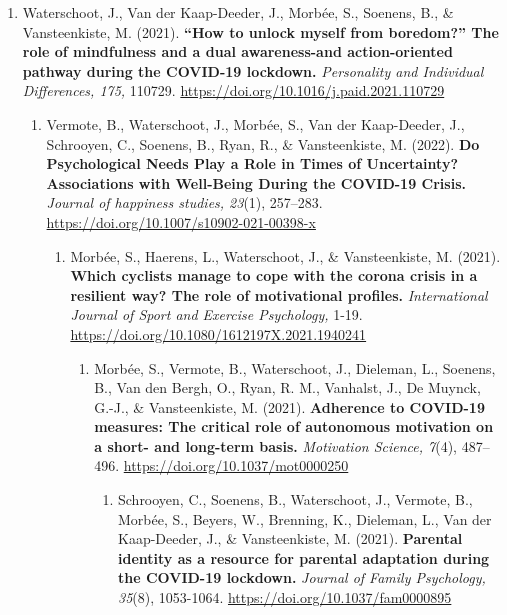 \documentclass[
  twocolumn]{article}
\providecommand{\tightlist}{%
  \setlength{\itemsep}{0pt}\setlength{\parskip}{0pt}}
\begin{document}
\begin{enumerate}
\def\labelenumi{\arabic{enumi}.}
\setcounter{enumi}{8}
\tightlist
\item
  Waterschoot, J., Van der Kaap-Deeder, J., Morbée, S., Soenens, B., \&
  Vansteenkiste, M. (2021). \textbf{``How to unlock myself from
  boredom?'' The role of mindfulness and a dual awareness-and
  action-oriented pathway during the COVID-19 lockdown.}
  \emph{Personality and Individual Differences, 175,} 110729.
  \url{https://doi.org/10.1016/j.paid.2021.110729}

  \begin{enumerate}
  \def\labelenumii{\arabic{enumii}.}
  \setcounter{enumii}{7}
  \tightlist
  \item
    Vermote, B., Waterschoot, J., Morbée, S., Van der Kaap-Deeder, J.,
    Schrooyen, C., Soenens, B., Ryan, R., \& Vansteenkiste, M. (2022).
    \textbf{Do Psychological Needs Play a Role in Times of Uncertainty?
    Associations with Well-Being During the COVID-19 Crisis.}
    \emph{Journal of happiness studies, 23}(1), 257--283.
    \url{https://doi.org/10.1007/s10902-021-00398-x}

    \begin{enumerate}
    \def\labelenumiii{\arabic{enumiii}.}
    \setcounter{enumiii}{6}
    \tightlist
    \item
      Morbée, S., Haerens, L., Waterschoot, J., \& Vansteenkiste, M.
      (2021). \textbf{Which cyclists manage to cope with the corona
      crisis in a resilient way? The role of motivational profiles.}
      \emph{International Journal of Sport and Exercise Psychology,}
      1-19. \url{https://doi.org/10.1080/1612197X.2021.1940241}

      \begin{enumerate}
      \def\labelenumiv{\arabic{enumiv}.}
      \setcounter{enumiv}{5}
      \tightlist
      \item
        Morbée, S., Vermote, B., Waterschoot, J., Dieleman, L., Soenens,
        B., Van den Bergh, O., Ryan, R. M., Vanhalst, J., De Muynck,
        G.-J., \& Vansteenkiste, M. (2021). \textbf{Adherence to
        COVID-19 measures: The critical role of autonomous motivation on
        a short- and long-term basis.} \emph{Motivation Science, 7}(4),
        487--496. \url{https://doi.org/10.1037/mot0000250}

        \begin{enumerate}
        \def\labelenumv{\arabic{enumv}.}
        \tightlist
        \item
          Schrooyen, C., Soenens, B., Waterschoot, J., Vermote, B.,
          Morbée, S., Beyers, W., Brenning, K., Dieleman, L., Van der
          Kaap-Deeder, J., \& Vansteenkiste, M. (2021). \textbf{Parental
          identity as a resource for parental adaptation during the
          COVID-19 lockdown.} \emph{Journal of Family Psychology,
          35}(8), 1053-1064. \url{https://doi.org/10.1037/fam0000895}


\end{enumerate}
\end{enumerate}
\end{enumerate}
\end{enumerate}
\end{enumerate}
\end{document}

